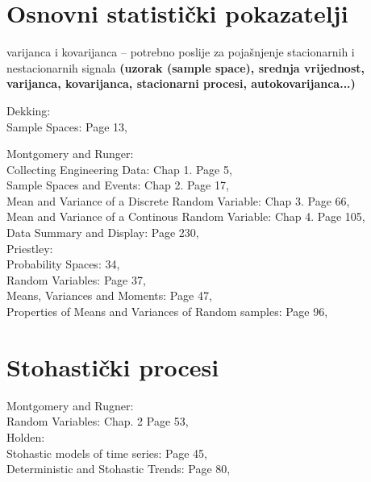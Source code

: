 \documentclass[a4paper,12pt,oneside]{memoir}
\begin{document}
        \section{Osnovni statistički pokazatelji}
            varijanca i kovarijanca -- potrebno poslije za pojašnjenje stacionarnih i nestacionarnih signala
            \textbf{(uzorak (sample space), srednja vrijednost, varijanca, kovarijanca, stacionarni procesi, autokovarijanca...)}

            Dekking:\\
            Sample Spaces: Page 13,


            
            Montgomery and Runger:\\
            Collecting Engineering Data: Chap 1. Page 5,\\
            Sample Spaces and Events: Chap 2. Page 17,\\
            Mean and Variance of a Discrete Random Variable: Chap 3. Page 66,\\
            Mean and Variance of a Continous Random Variable: Chap 4. Page 105,\\
            Data Summary and Display: Page 230,\\


            Priestley:\\
                Probability Spaces: 34,\\
                Random Variables: Page 37,\\
                Means, Variances and Moments: Page 47,\\
                Properties of Means and Variances of Random samples: Page 96,\\

        \section{Stohastički procesi} \label{stoh_proc}
            Montgomery and Rugner:\\
            Random Variables: Chap. 2 Page 53,\\

            Holden:\\
            Stohastic models of time series: Page 45,\\
            Deterministic and Stohastic Trends: Page 80,\\
\end{document}
